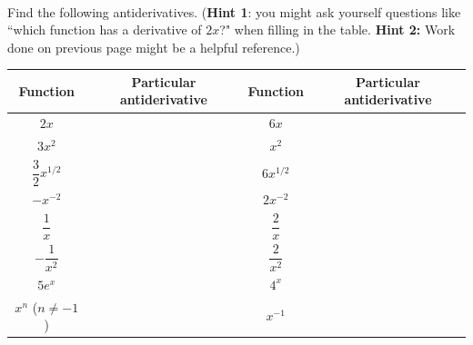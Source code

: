 \documentclass[10pt]{article}
\begin{document}
\\

{\exercise} Find the following antiderivatives. ({\bf Hint 1}: you might ask yourself questions like ``which function has a derivative of $2x$?" when filling in the table. {\bf Hint 2:} Work done on previous page might be a helpful reference.)

\renewcommand{\arraystretch}{2}


%
\begin{center}
    \begin{tabularx}{6in}{ | C{1} | C{1} || C{1} | C{1} | }
    \hline
    Function & Particular antiderivative & Function & Particular antiderivative\\
    \hline
    $2x$ & & $6x$ & \\
    \hline
    $3x^2$ & & $x^2$ & \\
    \hline
    $\dfrac32x^{1/2}$ & & $6x^{1/2}$ & \\
    \hline
    $-x^{-2}$ & & $2x^{-2}$ & \\
    \hline
    $\dfrac1x$ & & $\dfrac{2}{x}$ & \\
    \hline
    $-\dfrac1{x^2}$ & & $\dfrac2{x^2}$ & \\
    \hline
    $5e^x$ & & $ 4^x$ & \\
    \hline
      $x^n$ ($n\not=-1$) & & $x^{-1}$ & \\
      \hline
    \end{tabularx}
\end{center}
\end{document}
